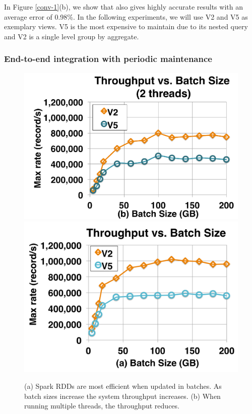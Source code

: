 In Figure \ref{conv-1}(b), we show that \svc also gives highly accurate results with an average error of 0.98\%.
In the following experiments, we will use V2 and V5 as exemplary views.
V5 is the most expensive to maintain due to its nested query and V2 is a single level group by aggregate.

\iffalse
\subsubsection{End-to-end integration with periodic maintenance}
\begin{figure}[t]
\centering
 \includegraphics[scale=0.14]{exp/con_1.pdf}
 \includegraphics[scale=0.14]{exp/con_2.pdf}\vspace{-1em}
 \caption{(a) Spark RDDs are most efficient when updated in batches. As batch sizes increase the system throughput increases. (b) When running multiple threads, the throughput reduces. \label{conv-2}}\vspace{-1.25em}
\end{figure}

